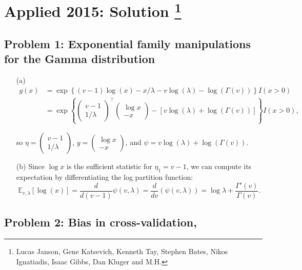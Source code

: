 \section{Applied 2015: Solution \footnote{Lucas Janson, Gene Katsevich, Kenneth Tay, Stephen Bates, Nikos Ignatiadis, Isaac Gibbs, Dan Kluger and M.H.}}


\subsection*{Problem 1: Exponential family manipulations for the Gamma distribution}
\begin{itemize}
\item[(a)] \begin{align*}
g(x) &= \exp \left\{ (v-1)\log(x) - x/\lambda - v\log(\lambda) - \log(\Gamma(v)) \right\} I(x > 0)\\
&= \exp \left\{ \begin{pmatrix} v-1 \\ 1/\lambda \end{pmatrix}^\top \begin{pmatrix}\log x \\ -x \end{pmatrix} - \left[v\log(\lambda) + \log(\Gamma(v)) \right] \right\}I(x > 0),
\end{align*}

so $\eta = \begin{pmatrix} v-1 \\ 1/\lambda \end{pmatrix}$, $y = \begin{pmatrix}\log x \\ -x \end{pmatrix}$, and $\psi = v\log(\lambda) + \log(\Gamma(v))$.

\item[(b)] Since $\log x $ is the sufficient statistic for $\eta_1 = v - 1$, we can compute its expectation by differentiating the log partition function:
\begin{equation*} \mathbb E_{v, \lambda}[\log(x)] = \frac{d}{d(v-1)}\psi(v, \lambda) = \frac{d}{dv}(\psi(v, \lambda)) = \log \lambda + \frac{\Gamma'(v)}{\Gamma(v)}. \end{equation*}
\end{itemize}


\subsection*{Problem 2: Bias in cross-validation, \citep[Ch. 7.10]{hastie2009elements}}

